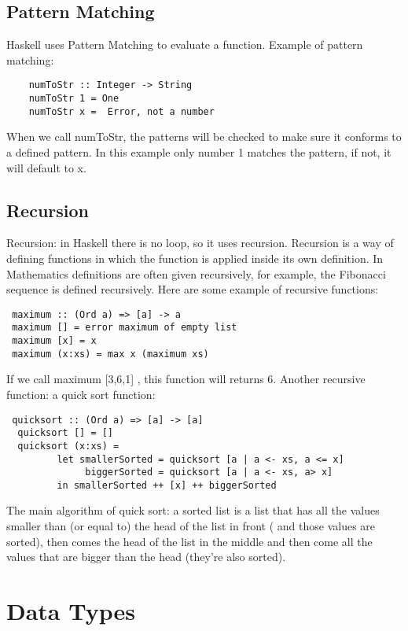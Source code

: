 \documentclass{article}
\begin{document}
\subsection{Pattern Matching}
Haskell uses Pattern Matching to evaluate a function.
\newline Example of pattern matching:
\begin{lstlisting}
	numToStr :: Integer -> String
	numToStr 1 = One
	numToStr x =  Error, not a number
\end{lstlisting}
 When we call numToStr, the patterns will be checked to make sure it conforms to a defined pattern. In this example only number 1 matches the pattern, if not, it will default to x.    

\subsection{Recursion}
Recursion: in Haskell there is no loop, so it uses recursion.
\newline Recursion is a way of defining functions in which the function is applied inside its own definition. In Mathematics definitions are often given recursively, for example, the Fibonacci sequence is defined recursively.
\newline\newline Here are some example of recursive functions:
\begin{lstlisting}
 maximum :: (Ord a) => [a] -> a
 maximum [] = error maximum of empty list
 maximum [x] = x
 maximum (x:xs) = max x (maximum xs)
\end{lstlisting}
If we call maximum [3,6,1] , this function will returns 6.
\newline\newline Another recursive function: a quick sort function: 
\begin{lstlisting}
 quicksort :: (Ord a) => [a] -> [a]
  quicksort [] = []
  quicksort (x:xs) = 
         let smallerSorted = quicksort [a | a <- xs, a <= x]
              biggerSorted = quicksort [a | a <- xs, a> x]
         in smallerSorted ++ [x] ++ biggerSorted
\end{lstlisting}
The main algorithm of quick sort: a sorted list is a list that has  all the values smaller than (or equal to) the head of the list in front ( and those values are sorted), then comes the head of the list in the middle and then come all the values that are bigger than the head (they’re also sorted).


\section{Data Types}
\end{document}
